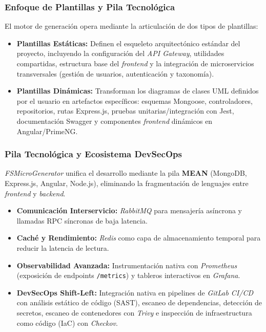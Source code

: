 \vspace{0.5cm}

\subsubsection{Enfoque de Plantillas y Pila Tecnológica}
El motor de generación opera mediante la articulación de dos tipos de plantillas: %
\begin{itemize}
    \item \textbf{Plantillas Estáticas:} Definen el esqueleto arquitectónico estándar del proyecto, incluyendo la configuración del \textit{API Gateway}, utilidades compartidas, estructura base del \textit{frontend} y la integración de microservicios transversales (gestión de usuarios, autenticación y taxonomía). %
    \item \textbf{Plantillas Dinámicas:} Transforman los diagramas de clases UML definidos por el usuario en artefactos específicos: esquemas Mongoose, controladores, repositorios, rutas Express.js, pruebas unitarias/integración con Jest, documentación Swagger y componentes \textit{frontend} dinámicos en Angular/PrimeNG. %
\end{itemize}

\subsubsection{Pila Tecnológica y Ecosistema DevSecOps}
\textit{FSMicroGenerator} unifica el desarrollo mediante la pila \textbf{MEAN} (MongoDB, Express.js, Angular, Node.js), eliminando la fragmentación de lenguajes entre \textit{frontend} y \textit{backend}. %
\begin{itemize}
    \item \textbf{Comunicación Interservicio:} \textit{RabbitMQ} para mensajería asíncrona y llamadas RPC síncronas de baja latencia. %
    \item \textbf{Caché y Rendimiento:} \textit{Redis} como capa de almacenamiento temporal para reducir la latencia de lectura. %
    \item \textbf{Observabilidad Avanzada:} Instrumentación nativa con \textit{Prometheus} (exposición de endpoints \texttt{/metrics}) y tableros interactivos en \textit{Grafana}. %
    \item \textbf{DevSecOps Shift-Left:} Integración nativa en pipelines de \textit{GitLab CI/CD} con análisis estático de código (SAST), escaneo de dependencias, detección de secretos, escaneo de contenedores con \textit{Trivy} e inspección de infraestructura como código (IaC) con \textit{Checkov}. %
\end{itemize}

